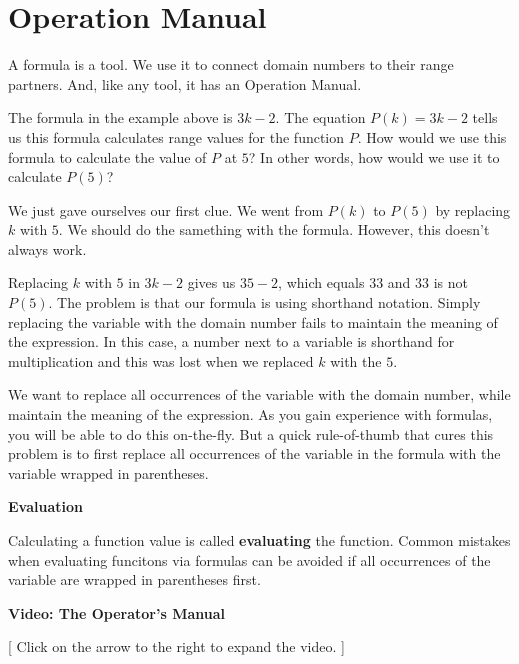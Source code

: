 \documentclass{ximera}
\begin{document}
\section{Operation Manual}

A formula is a tool.  We use it to connect domain numbers to their range partners.  And, like any tool, it has an Operation Manual.



The formula in the example above is $3k - 2$.  The equation $P(k) = 3k - 2$ tells us this formula calculates range values for the function $P$.  How would we use this formula to calculate the value of $P$ at $5$?   In other words, how would we use it to calculate $P(5)$?

We just gave ourselves our first clue. We went from $P(k)$ to $P(5)$ by replacing $k$ with $5$.  We should do the samething with the formula. However, this doesn't always work.






Replacing $k$ with $5$ in $3k - 2$ gives us $35-2$, which equals $33$ and $33$ is not $P(5)$. The problem is that our formula is using shorthand notation. Simply replacing the variable with the domain number fails to maintain the meaning of the expression.  In this case, a number next to a variable is shorthand for multiplication and this was lost when we replaced $k$ with the $5$.

We want to replace all occurrences of the variable with the domain number, while maintain the meaning of the expression.  As you gain experience with formulas, you will be able to do this on-the-fly.  But a quick rule-of-thumb that cures this problem is to first replace all occurrences of the variable in the formula with the variable wrapped in parentheses.


\begin{procedure} \textbf{\textcolor{purple!85!blue}{Evaluation}}   

Calculating a function value is called \textbf{evaluating} the function.  Common mistakes when evaluating funcitons via formulas can be avoided if all occurrences of the variable are wrapped in parentheses first.
\end{procedure}








\begin{explanation} \textbf{Video: The Operator's Manual}

[ Click on the arrow to the right to expand the video. ]
\begin{expandable} 

\begin{center}
\end{center}

\end{expandable}
\end{explanation}
\end{document}
